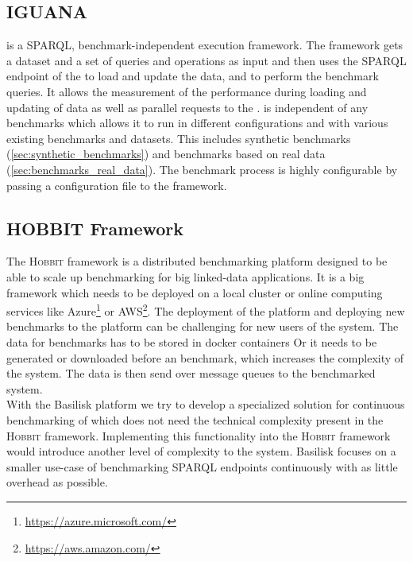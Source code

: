 \subsection{IGUANA}
\label{sec:iguana}
\iguana{} is a SPARQL, benchmark-independent execution framework\cite{conradsIguanaGenericFramework2017}.
The framework gets a dataset and a set of queries and operations as input and then uses the SPARQL endpoint of the \ts{} to load and update the data, and to perform the benchmark queries.
It allows the measurement of the performance during loading and updating of data as well as parallel requests to the \ts{}.
\iguana{} is independent of any benchmarks which allows it to run in different configurations and with various existing benchmarks and datasets.
This includes synthetic benchmarks (\ref{sec:synthetic_benchmarks}) and benchmarks based on real data (\ref{sec:benchmarks_real_data}).
The benchmark process is highly configurable by passing a configuration file to the \iguana{} framework.


\subsection{HOBBIT Framework}
The \textsc{Hobbit} framework is a distributed benchmarking platform designed to be able to scale up benchmarking for big linked-data applications\cite{roderHOBBITPlatformBenchmarking}.
It is a big framework which needs to be deployed on a local cluster or online computing services like Azure\footnote{\url{https://azure.microsoft.com/}} or AWS\footnote{\url{https://aws.amazon.com/}}.
The deployment of the platform and deploying new benchmarks to the platform can be challenging for new users of the system\cite{roderHOBBITPlatformBenchmarking}.
The data for benchmarks has to be stored in docker containers
Or it needs to be generated or downloaded before an benchmark, which increases the complexity of the system.
The data is then send over message queues to the benchmarked system.
\\

With the Basilisk platform we try to develop a specialized solution for continuous benchmarking of \tsp{} which does not need the technical complexity present in the \textsc{Hobbit} framework.
Implementing this functionality into the \textsc{Hobbit} framework would introduce another level of complexity to the system.
Basilisk focuses on a smaller use-case of benchmarking SPARQL endpoints continuously with as little overhead as possible.

